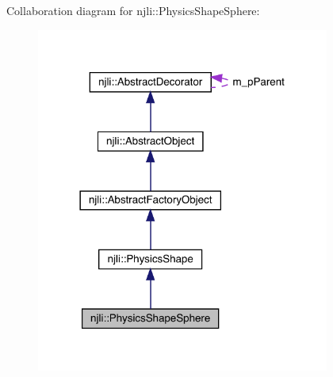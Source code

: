 Collaboration diagram for njli\+:\+:Physics\+Shape\+Sphere\+:\nopagebreak
\begin{figure}[H]
\begin{center}
\leavevmode
\includegraphics[width=273pt]{classnjli_1_1_physics_shape_sphere__coll__graph}
\end{center}
\end{figure}
